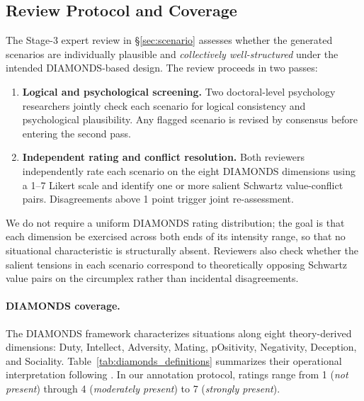 \documentclass[11pt]{article}
\begin{document}
\subsection{Review Protocol and Coverage}
\label{app:scenario_validation}

The Stage-3 expert review in \S\ref{sec:scenario} assesses whether the generated scenarios are individually plausible and \emph{collectively well-structured} under the intended DIAMONDS-based design. The review proceeds in two passes:

\begin{enumerate}[leftmargin=1.5em, itemsep=2pt]
  \item \textbf{Logical and psychological screening.} Two doctoral-level psychology researchers jointly check each scenario for logical consistency and psychological plausibility. Any flagged scenario is revised by consensus before entering the second pass.
  \item \textbf{Independent rating and conflict resolution.} Both reviewers independently rate each scenario on the eight DIAMONDS dimensions using a 1--7 Likert scale and identify one or more salient Schwartz value-conflict pairs. Disagreements above 1 point trigger joint re-assessment.
\end{enumerate}

We do not require a uniform DIAMONDS rating distribution; the goal is that each dimension be exercised across both ends of its intensity range, so that no situational characteristic is structurally absent. Reviewers also check whether the salient tensions in each scenario correspond to theoretically opposing Schwartz value pairs on the circumplex rather than incidental disagreements.

\paragraph{DIAMONDS coverage.}
\label{app:diamonds_coverage}
The DIAMONDS framework characterizes situations along eight theory-derived dimensions: Duty, Intellect, Adversity, Mating, pOsitivity, Negativity, Deception, and Sociality. Table~\ref{tab:diamonds_definitions} summarizes their operational interpretation following \citet{rauthmann2014diamonds}. In our annotation protocol, ratings range from 1 (\emph{not present}) through 4 (\emph{moderately present}) to 7 (\emph{strongly present}).
\end{document}
